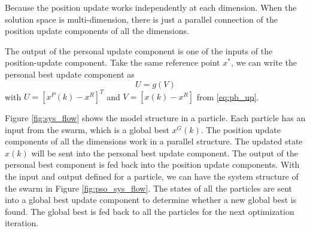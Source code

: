 Because the position update works independently at each dimension.
When the solution space is multi-dimension, there is just a parallel connection of the position update components of all the dimensions.

The output of the personal update component is one of the inputs of the position-update component.
Take the same reference point $ x^{*} $, we can write the personal best update component as 
\begin{equation}
\label{eq:pso_input_up}
U = g(V)
\end{equation}
with $ U = [ x^{P}(k) - x^{R} ]^{T} $ 
and $ V = [ x(k) - x^{R} ] $
from \eqref{eq:pb_up}. 

Figure \ref{fig:sys_flow} shows the model structure in a particle.
Each particle has an input from the swarm, which is a global best $ x^{G} (k) $.
The position update components of all the dimensions work in a parallel structure.
The updated state $ x (k) $ will be sent into the personal best update component.
The output of the personal best component is fed back into the position update components.
With the input and output defined for a particle, we can have the system structure of the swarm in Figure \ref{fig:pso_sys_flow}.
The states of all the particles are sent into a global best update component to determine whether a new global best is found.
The global best is fed back to all the particles for the next optimization iteration.

